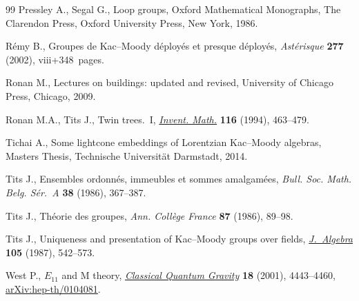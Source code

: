 \documentclass[pdftex]{sigma}
\numberwithin{equation}{section}
\begin{document}
\begin{thebibliography}{99}
Pressley A., Segal G., Loop groups, Oxford Mathematical Monographs, The
 Clarendon Press, Oxford University Press, New York, 1986.

R\'emy B., Groupes de {K}ac--{M}oody d\'eploy\'es et presque d\'eploy\'es, \textit{Ast\'erisque} \textbf{277} (2002), viii+348~pages.

Ronan M., Lectures on buildings: updated and revised, University of Chicago Press, Chicago, 2009.

Ronan M.A., Tits J., Twin trees.~{I}, \href{https://doi.org/10.1007/BF01231569}{\textit{Invent. Math.}} \textbf{116}
 (1994), 463--479.

Tichai A., Some lightcone embeddings of {L}orentzian {K}ac--{M}oody algebras,
 {M}asters Thesis, {T}echnische {U}niversit\"at {D}armstadt, 2014.

Tits J., Ensembles ordonn\'es, immeubles et sommes amalgam\'ees,
 \textit{Bull. Soc. Math. Belg. S\'er.~A} \textbf{38} (1986), 367--387.

Tits J., Th\'eorie des groupes, \textit{Ann. Coll\`ege France} \textbf{87}
 (1986), 89--98.

Tits J., Uniqueness and presentation of {K}ac--{M}oody groups over fields,
 \href{https://doi.org/10.1016/0021-8693(87)90214-6}{\textit{J.~Algebra}} \textbf{105} (1987), 542--573.

West P., {$E_{11}$} and {M} theory, \href{https://doi.org/10.1088/0264-9381/18/21/305}{\textit{Classical Quantum Gravity}}
 \textbf{18} (2001), 4443--4460, \href{https://arxiv.org/abs/hep-th/0104081}{arXiv:hep-th/0104081}.

\end{thebibliography}\LastPageEnding
\end{document}
